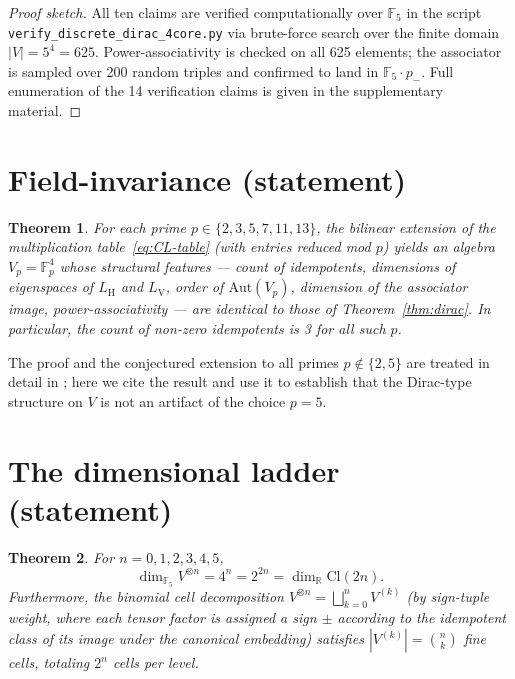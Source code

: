 \documentclass[11pt,reqno]{amsart}
\theoremstyle{plain}
\newtheorem{theorem}{Theorem}[section]
\theoremstyle{definition}
\theoremstyle{remark}
\newcommand{\F}{\mathbb{F}}
\newcommand{\R}{\mathbb{R}}
\newcommand{\Cl}{\mathrm{Cl}}
\newcommand{\Aut}{\mathrm{Aut}}
\DeclareMathOperator{\HARM}{H}
\DeclareMathOperator{\VOID}{V}
\begin{document}
\begin{proof}[Proof sketch]
All ten claims are verified computationally over $\F_5$ in
the script \texttt{verify\_discrete\_dirac\_4core.py} via brute-force
search over the finite domain $|V| = 5^4 = 625$. Power-associativity
is checked on all 625 elements; the associator is sampled over 200
random triples and confirmed to land in $\F_5 \cdot p_-$. Full
enumeration of the 14 verification claims is given in the supplementary
material.
\end{proof}

\section{Field-invariance (statement)}
\label{sec:fpuniv}

\begin{theorem}\label{thm:fpuniv}
For each prime $p \in \{2, 3, 5, 7, 11, 13\}$, the bilinear extension
of the multiplication table~\eqref{eq:CL-table} (with entries reduced
mod $p$) yields an algebra $V_p = \F_p^4$ whose structural features ---
count of idempotents, dimensions of eigenspaces of $L_{\HARM}$ and
$L_{\VOID}$, order of $\Aut(V_p)$, dimension of the associator image,
power-associativity --- are identical to those of
Theorem~\ref{thm:dirac}. In particular, the count of non-zero
idempotents is 3 for all such $p$.
\end{theorem}

The proof and the conjectured extension to all primes
$p \notin \{2, 5\}$ are treated in detail in
\cite{SandersGishFpUniversality}; here we cite the result and use it
to establish that the Dirac-type structure on $V$ is not an artifact
of the choice $p = 5$.

\section{The dimensional ladder (statement)}
\label{sec:clifford}

\begin{theorem}\label{thm:clifford}
For $n = 0, 1, 2, 3, 4, 5$,
\[
\dim_{\F_5} V^{\otimes n} = 4^n = 2^{2n} = \dim_\R \Cl(2n).
\]
Furthermore, the binomial cell decomposition
$V^{\otimes n} = \bigsqcup_{k=0}^n V^{(k)}$ (by sign-tuple weight, where
each tensor factor is assigned a sign $\pm$ according to the idempotent
class of its image under the canonical embedding) satisfies
$|V^{(k)}| = \binom{n}{k}$ fine cells, totaling $2^n$ cells per level.
\end{theorem}
\end{document}
